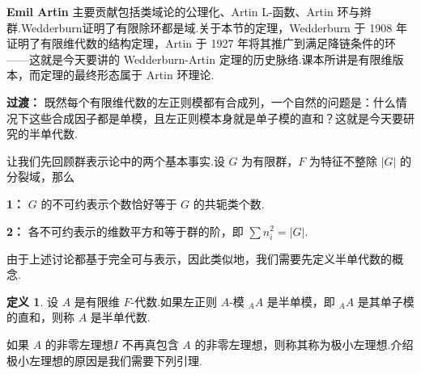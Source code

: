 \documentclass[11pt,a4paper]{article}
\theoremstyle{plain}
\theoremstyle{definition}
\newtheorem{defn}[thm]{定义}
\begin{document}

\noindent \textbf{Emil Artin} 主要贡献包括类域论的公理化、Artin L-函数、Artin 环与辫群.Wedderburn证明了有限除环都是域.关于本节的定理，Wedderburn 于 1908 年证明了有限维代数的结构定理，Artin 于 1927 年将其推广到满足降链条件的环——这就是今天要讲的 Wedderburn-Artin 定理的历史脉络.课本所讲是有限维版本，而定理的最终形态属于 Artin 环理论.\par



\noindent \textbf{过渡：} 既然每个有限维代数的左正则模都有合成列，一个自然的问题是：什么情况下这些合成因子都是单模，且左正则模本身就是单子模的直和？这就是今天要研究的半单代数.



\noindent 让我们先回顾群表示论中的两个基本事实.设 $G$ 为有限群，$F$ 为特征不整除 $|G|$ 的分裂域，那么\par
\noindent \textbf{1：} $G$ 的不可约表示个数恰好等于 $G$ 的共轭类个数.\par
\noindent \textbf{2：} 各不可约表示的维数平方和等于群的阶，即 $\sum n_i^2 = |G|$.\par


\par
由于上述讨论都基于完全可与表示，因此类似地，我们需要先定义半单代数的概念.

\setcounter{thm}{0}

\begin{defn}
设 $A$ 是有限维 $F$-代数.如果左正则 $A$-模 ${}_A A$ 是半单模，即 ${}_A A$ 是其单子模的直和，则称 $A$ 是半单代数.
\end{defn}

如果 $A$ 的非零左理想$I$ 不再真包含 $A$ 的非零左理想，则称其称为极小左理想.介绍极小左理想的原因是我们需要下列引理.
\end{document}
